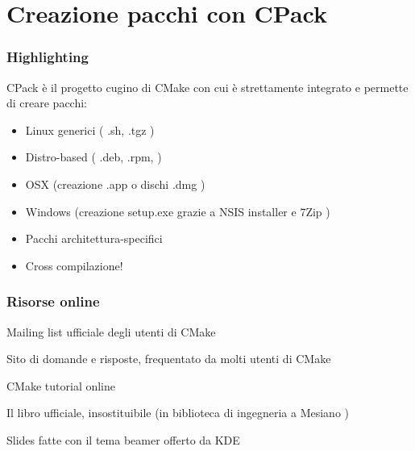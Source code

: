 \documentclass[12pt]{beamer}
\begin{document}
\section{Creazione pacchi con CPack}
\begin{frame}
  \frametitle{Highlighting}
CPack è il progetto cugino di CMake con cui è strettamente integrato e permette di creare pacchi:
\begin{itemize}
	\item Linux generici ( .sh, .tgz )
	\item Distro-based ( .deb, .rpm, )
	\item OSX (creazione .app o dischi .dmg )
	\item Windows (creazione setup.exe grazie a NSIS installer e 7Zip )
\end{itemize}
\begin{itemize}
	\item Pacchi architettura-specifici
	\item Cross compilazione!
\end{itemize}

\end{frame}


\newcommand{\putlink}[1]{%
   \pgfsetlinewidth{1.4pt}%
   \pgfsetendarrow{\pgfarrowtriangle{4pt}}%
   \pgfline{\pgfxy(1,1)}{\pgfxy(#1,1)}
}

\begin{frame}
  \frametitle{Risorse online}
  \begin{thebibliography}{10}

  \beamertemplatearticlebibitems

	Mailing list ufficiale degli utenti di CMake
	
	Sito di domande e risposte, frequentato da molti utenti di CMake
	
	CMake tutorial online
	
	Il libro ufficiale, insostituibile (in biblioteca di ingegneria a Mesiano )
	
    Slides fatte con il tema beamer offerto da KDE

  \end{thebibliography}
\end{frame}

\end{document}
